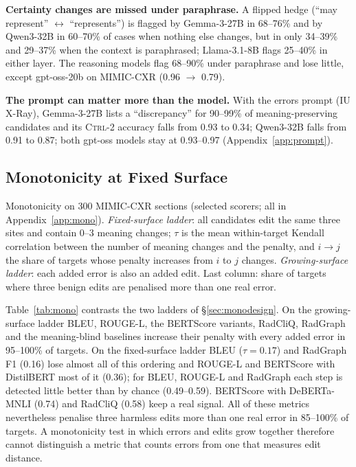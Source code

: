 \documentclass[11pt]{article}
\newcommand{\ctrlt}{\textsc{Ctrl-2}\xspace}
\begin{document}
\textbf{Certainty changes are missed under paraphrase.} A flipped hedge (``may represent'' $\leftrightarrow$ ``represents'') is flagged by Gemma-3-27B in 68--76\% and by Qwen3-32B in 60--70\% of cases when nothing else changes, but in only 34--39\% and 29--37\% when the context is paraphrased; Llama-3.1-8B flags 25--40\% in either layer. The reasoning models flag 68--90\% under paraphrase and lose little, except gpt-oss-20b on MIMIC-CXR (0.96 $\to$ 0.79).

\textbf{The prompt can matter more than the model.} With the errors prompt (IU X-Ray), Gemma-3-27B lists a ``discrepancy'' for 90--99\% of meaning-preserving candidates and its \ctrlt accuracy falls from 0.93 to 0.34; Qwen3-32B falls from 0.91 to 0.87; both gpt-oss models stay at 0.93--0.97 (Appendix~\ref{app:prompt}).

\subsection{Monotonicity at Fixed Surface}

\begin{table}[t]
\centering
\scriptsize
\setlength{\tabcolsep}{2.5pt}
\begin{adjustbox}{max width=\columnwidth}

\end{adjustbox}
\caption{Monotonicity on 300 MIMIC-CXR sections (selected scorers; all in Appendix~\ref{app:mono}). \emph{Fixed-surface ladder}: all candidates edit the same three sites and contain 0--3 meaning changes; $\tau$ is the mean within-target Kendall correlation between the number of meaning changes and the penalty, and $i{\to}j$ the share of targets whose penalty increases from $i$ to $j$ changes. \emph{Growing-surface ladder}: each added error is also an added edit. Last column: share of targets where three benign edits are penalised more than one real error.}
\label{tab:mono}
\end{table}

Table~\ref{tab:mono} contrasts the two ladders of \S\ref{sec:monodesign}. On the growing-surface ladder BLEU, ROUGE-L, the BERTScore variants, RadCliQ, RadGraph and the meaning-blind baselines increase their penalty with every added error in 95--100\% of targets. On the fixed-surface ladder BLEU ($\tau{=}0.17$) and RadGraph F1 (0.16) lose almost all of this ordering and ROUGE-L and BERTScore with DistilBERT most of it (0.36); for BLEU, ROUGE-L and RadGraph each step is detected little better than by chance (0.49--0.59). BERTScore with DeBERTa-MNLI (0.74) and RadCliQ (0.58) keep a real signal. All of these metrics nevertheless penalise three harmless edits more than one real error in 85--100\% of targets. A monotonicity test in which errors and edits grow together therefore cannot distinguish a metric that counts errors from one that measures edit distance.
\end{document}
